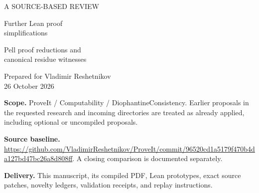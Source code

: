 \documentclass[11pt,letterpaper]{article}
\begin{document}
\begin{titlepage}
\vspace*{1.1in}
{\sffamily\color{accent}\large A SOURCE-BASED REVIEW}\par
\vspace{0.3in}
{\sffamily\color{ink}\Huge Further Lean proof\\ simplifications}\par
\vspace{0.25in}
{\sffamily\LARGE Pell proof reductions and\\ canonical residue witnesses}\par
\vspace{0.65in}
{\large Prepared for Vladimir Reshetnikov\\26 October 2026}\par
\vfill
\textbf{Scope.} ProveIt / Computability / DiophantineConsistency. Earlier proposals in the requested research and incoming directories are treated as already applied, including optional or uncompiled proposals.\par
\textbf{Source baseline.} \url{https://github.com/VladimirReshetnikov/ProveIt/commit/96520cd1a5179f470b4da127bd47bc26a8d808ff}. A closing comparison is documented separately.\par
\textbf{Delivery.} This manuscript, its compiled PDF, Lean prototypes, exact source patches, novelty ledgers, validation receipts, and replay instructions.\par
\end{titlepage}
\tableofcontents
\newpage








\end{document}
